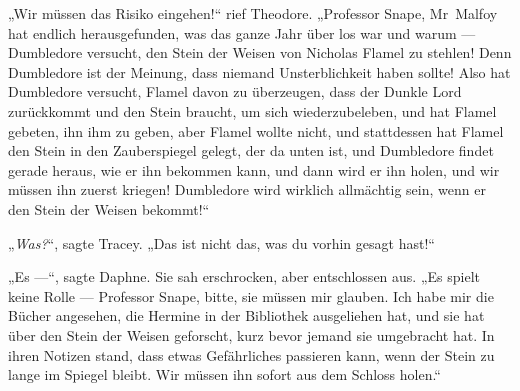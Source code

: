 „Wir müssen das Risiko eingehen!“ rief Theodore.
„Professor Snape, Mr~Malfoy hat endlich herausgefunden, was das ganze Jahr über los war und warum — Dumbledore versucht, den Stein der Weisen von Nicholas Flamel zu stehlen! Denn Dumbledore ist der Meinung, dass niemand Unsterblichkeit haben sollte! Also hat Dumbledore versucht, Flamel davon zu überzeugen, dass der Dunkle Lord zurückkommt und den Stein braucht, um sich wiederzubeleben, und hat Flamel gebeten, ihn ihm zu geben, aber Flamel wollte nicht, und stattdessen hat Flamel den Stein in den Zauberspiegel gelegt, der da unten ist, und Dumbledore findet gerade heraus, wie er ihn bekommen kann, und dann wird er ihn holen, und wir müssen ihn zuerst kriegen! Dumbledore wird wirklich allmächtig sein, wenn er den Stein der Weisen bekommt!“

„\emph{Was?}“, sagte Tracey.
„Das ist nicht das, was du vorhin gesagt hast!“

„Es —“, sagte Daphne. Sie sah erschrocken, aber entschlossen aus.
„Es spielt keine Rolle — Professor Snape, bitte, sie müssen mir glauben. Ich habe mir die Bücher angesehen, die Hermine in der Bibliothek ausgeliehen hat, und sie hat über den Stein der Weisen geforscht, kurz bevor jemand sie umgebracht hat. In ihren Notizen stand, dass etwas Gefährliches passieren kann, wenn der Stein zu lange im Spiegel bleibt. Wir müssen ihn sofort aus dem Schloss holen.“

